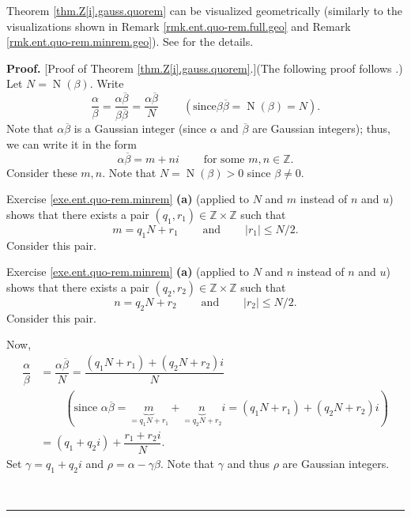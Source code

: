 \documentclass[numbers=enddot,12pt,final,onecolumn,notitlepage]{scrartcl}%
\numberwithin{exer}{subsection}
\theoremstyle{definition}
\newenvironment{proof}[1][Proof]{\noindent\textbf{#1.} }{\ \rule{0.5em}{0.5em}}
\begin{document}
Theorem \ref{thm.Z[i].gauss.quorem} can be visualized geometrically (similarly
to the visualizations shown in Remark \ref{rmk.ent.quo-rem.full.geo} and
Remark \ref{rmk.ent.quo-rem.minrem.geo}). See \cite[\S 7]{Conrad-Gauss} for
the details.

\begin{proof}
[Proof of Theorem \ref{thm.Z[i].gauss.quorem}.](The following proof follows
\cite[proof of Theorem 3.1]{Conrad-Gauss}.) Let $N=\operatorname*{N}\left(
\beta\right)  $. Write%
\[
\dfrac{\alpha}{\beta}=\dfrac{\alpha\overline{\beta}}{\beta\overline{\beta}%
}=\dfrac{\alpha\overline{\beta}}{N}\ \ \ \ \ \ \ \ \ \ \left(  \text{since
}\beta\overline{\beta}=\operatorname*{N}\left(  \beta\right)  =N\right)  .
\]
Note that $\alpha\overline{\beta}$ is a Gaussian integer (since $\alpha$ and
$\overline{\beta}$ are Gaussian integers); thus, we can write it in the form
\[
\alpha\overline{\beta}=m+ni\ \ \ \ \ \ \ \ \ \ \text{for some }m,n\in
\mathbb{Z}.
\]
Consider these $m,n$. Note that $N=\operatorname*{N}\left(  \beta\right)  >0$
since $\beta\neq0$.

Exercise \ref{exe.ent.quo-rem.minrem} \textbf{(a)} (applied to $N$ and $m$
instead of $n$ and $u$) shows that there exists a pair $\left(  q_{1}%
,r_{1}\right)  \in\mathbb{Z}\times\mathbb{Z}$ such that
\[
m=q_{1}N+r_{1}\ \ \ \ \ \ \ \ \ \ \text{and}\ \ \ \ \ \ \ \ \ \ \left\vert
r_{1}\right\vert \leq N/2.
\]
Consider this pair.

Exercise \ref{exe.ent.quo-rem.minrem} \textbf{(a)} (applied to $N$ and $n$
instead of $n$ and $u$) shows that there exists a pair $\left(  q_{2}%
,r_{2}\right)  \in\mathbb{Z}\times\mathbb{Z}$ such that
\[
n=q_{2}N+r_{2}\ \ \ \ \ \ \ \ \ \ \text{and}\ \ \ \ \ \ \ \ \ \ \left\vert
r_{2}\right\vert \leq N/2.
\]
Consider this pair.

Now,%
\begin{align}
\dfrac{\alpha}{\beta}  &  =\dfrac{\alpha\overline{\beta}}{N}=\dfrac{\left(
q_{1}N+r_{1}\right)  +\left(  q_{2}N+r_{2}\right)  i}{N}\nonumber\\
&  \ \ \ \ \ \ \ \ \ \ \left(  \text{since }\alpha\overline{\beta
}=\underbrace{m}_{=q_{1}N+r_{1}}+\underbrace{n}_{=q_{2}N+r_{2}}i=\left(
q_{1}N+r_{1}\right)  +\left(  q_{2}N+r_{2}\right)  i\right) \nonumber\\
&  =\left(  q_{1}+q_{2}i\right)  +\dfrac{r_{1}+r_{2}i}{N}.
\label{pf.thm.Z[i].gauss.quorem.4}%
\end{align}
Set $\gamma=q_{1}+q_{2}i$ and $\rho=\alpha-\gamma\beta$. Note that $\gamma$
and thus $\rho$ are Gaussian integers.


\end{proof}
\end{document}
